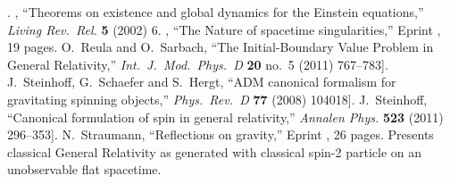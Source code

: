\begin{thebibliography}{99}
  [].
  \bysame, \newblock%
  ``Theorems on existence and global dynamics for the Einstein equations,''\newblock
  \emph{Living Rev.\ Rel.} {\bf 5} (2002) 6\newblock
  [\arXiv{gr-qc/0203012}].
  \bysame,\newblock%
  ``The Nature of spacetime singularities,''\newblock
  Eprint , 19 pages.
  O.~Reula and O.~Sarbach,\newblock
  ``The Initial-Boundary Value Problem in General Relativity,''\newblock
  \emph{Int.\ J.\ Mod.\ Phys.\ D} {\bf 20} no.~5 (2011) 767--783\newblock
  [\arXiv[gr-qc]{1009.0589}].
  J.~Steinhoff, G.~Schaefer and S.~Hergt,\newblock
  ``ADM canonical formalism for gravitating spinning objects,''\newblock
  \emph{Phys.\ Rev.\ D} {\bf 77} (2008) 104018\newblock
  [\arXiv[gr-qc]{0805.3136}].
  J.~Steinhoff,\newblock
  ``Canonical formulation of spin in general relativity,''\newblock
  \emph{Annalen Phys.} {\bf 523} (2011) 296--353\newblock
  [\arXiv[gr-qc]{1106.4203}].
  N.~Straumann,\newblock
  ``Reflections on gravity,''\newblock
  Eprint , 26 pages.\newblock
  Presents classical General Relativity as generated with
  classical spin-2 particle on an unobservable flat spacetime.  
\end{thebibliography}
%
%
\renewcommand\refname{Quantum Gravity}

